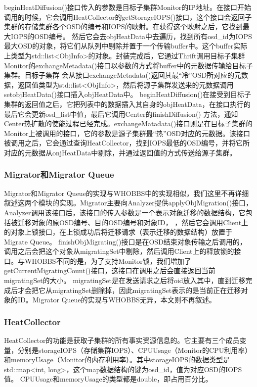 beginHeatDiffusion()接口传入的参数是目标子集群Monitor的IP地址。在接口开始调用的时候，它会调用HeatCollector的getStorageIOPS()接口，这个接口会返回子集群的存储集群各个OSD的编号和IOPS的映射。在获得这个映射之后，它找到最大IOPS的OSD编号。
然后它会去objHeatData中去遍历，找到所有osd\_id为IOPS最大OSD的对象，将它们从队列中剔除并置于一个传输buffer中。这个buffer实际上类型为std::list<ObjInfo>的对象。封装完成后，它通过Thrift调用目标子集群Monitor的exchangeMetadata()接口以参数的方式将buffer中的元数据传输给目标子集群。目标子集群
会从接口exchangeMetadata()返回其最“冷”OSD所对应的元数据，返回值类型为std::list<ObjInfo>，然后将源子集群发送来的元数据调用setobjHeatData()接口插入objHeatData中。
beginHeatDiffusion()在接受到目标子集群的返回值之后，它把列表中的数据插入其自身的objHeatData，在接口执行的最后它会更新osd\_list中值，最后它调用Center的finishDiffusion()
方法，通知Center热扩散的使能过程已经完成。exchangeMatadata()接口则是在目标子集群的Monitor上被调用的接口，它的参数是源子集群最“热”OSD对应的元数据。该接口被调用之后，它会通过查询HeatCollector，找到IOPS最低的OSD编号，并将它所对应的元数据从onjHeatData中剔除，并通过返回值的方式传送给源子集群。

\subsubsection{Migrator和Migrator Queue}
Migrator和Migrator Queue的实现与WHOBBS中的实现相似，我们这里不再详细叙述这两个模块的实现。Migrator主要向Analyzer提供applyObjMigration()接口，Analyzer调用该接口后，该接口的传入参数是一个表示对象迁移的数据结构，它包括被迁移对象的原OSD编号、目的OSD编号和对象ID，
，然后它会调用Client上的对象上锁接口，在上锁成功后将迁移请求（表示迁移的数据结构）放置于Migrate Queue。
finishObjMigrating()接口是在OSD结束对象传输之后调用的，调用之后会把这个对象从migratingSet中剔除，然后调用Client上的释放锁的接口\cite{lingxuan2015whobbs}。与WHOBBS不同的是，为了支持Monitor锁，我们增加了getCurrentMigratingCount()接口，这接口在调用之后会直接返回当前migratingSet的大小。
migratingSet是在发送请求之后将oid放入其中，直到迁移完成后才会把它从migratingSet删除掉，因此migratingSet表示的是当前正在迁移对象的ID。Migrator Queue的实现与WHOBBS无异，本文则不再叙述。

\subsubsection{HeatCollector}
HeatCollector的功能是获取子集群的所有事实资源信息的。它主要有三个成员变量，分别是storageIOPS（存储集群IOPS）、CPUUsage（Monitor的CPU利用率）和memoryUsage（Monitor的内存利用率）。其中storageIOPS的数据类型是std::map<int, long>，这个map数据结构的键为osd\_id，值为对应OSD的IOPS值。
CPUUsage和memoryUsage的类型都是double，即占用百分比。

